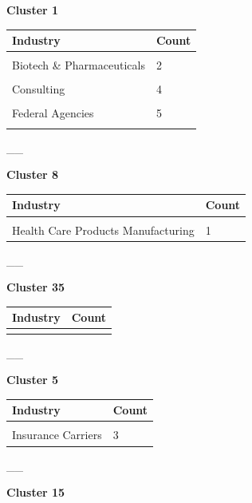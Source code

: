 \documentclass[
]{article}
\begin{document}
\textbf{Cluster 1}

\begin{tabular}{ll}
\toprule
Industry & Count\\
\midrule
\cellcolor{gray!10}{Aerospace \& Defense} & \cellcolor{gray!10}{2}\\
Biotech \& Pharmaceuticals & 2\\
\cellcolor{gray!10}{Computer Hardware \& Software} & \cellcolor{gray!10}{2}\\
Consulting & 4\\
\cellcolor{gray!10}{Enterprise Software \& Network Solutions} & \cellcolor{gray!10}{7}\\
\addlinespace
Federal Agencies & 5\\
\cellcolor{gray!10}{IT Services} & \cellcolor{gray!10}{12}\\
\bottomrule
\end{tabular}

\_\_

\textbf{Cluster 8}

\begin{tabular}{ll}
\toprule
Industry & Count\\
\midrule
\cellcolor{gray!10}{Biotech \& Pharmaceuticals} & \cellcolor{gray!10}{14}\\
Health Care Products Manufacturing & 1\\
\bottomrule
\end{tabular}

\_\_

\textbf{Cluster 35}

\begin{tabular}{ll}
\toprule
Industry & Count\\
\midrule
\cellcolor{gray!10}{Insurance Carriers} & \cellcolor{gray!10}{10}\\
\bottomrule
\end{tabular}

\_\_

\textbf{Cluster 5}

\begin{tabular}{ll}
\toprule
Industry & Count\\
\midrule
\cellcolor{gray!10}{Health Care Services \& Hospitals} & \cellcolor{gray!10}{1}\\
Insurance Carriers & 3\\
\bottomrule
\end{tabular}

\_\_

\textbf{Cluster 15}
\end{document}
